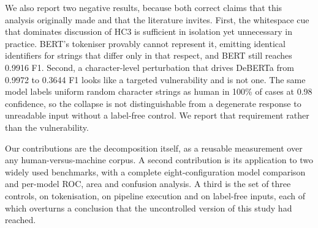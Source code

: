 We also report two negative results, because both correct claims that this analysis originally made and that the literature invites. First, the whitespace cue that dominates discussion of HC3 is sufficient in isolation yet unnecessary in practice. BERT's tokeniser provably cannot represent it, emitting identical identifiers for strings that differ only in that respect, and BERT still reaches 0.9916 F1. Second, a character-level perturbation that drives DeBERTa from 0.9972 to 0.3644 F1 looks like a targeted vulnerability and is not one. The same model labels uniform random character strings as human in 100\% of cases at 0.98 confidence, so the collapse is not distinguishable from a degenerate response to unreadable input without a label-free control. We report that requirement rather than the vulnerability.

Our contributions are the decomposition itself, as a reusable measurement over any human-versus-machine corpus. A second contribution is its application to two widely used benchmarks, with a complete eight-configuration model comparison and per-model ROC, area and confusion analysis. A third is the set of three controls, on tokenisation, on pipeline execution and on label-free inputs, each of which overturns a conclusion that the uncontrolled version of this study had reached.
